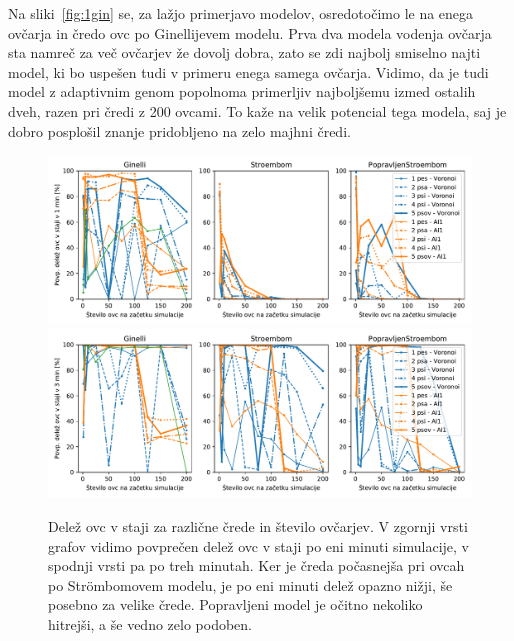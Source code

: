 Na sliki~\ref{fig:1gin} se, za lažjo primerjavo modelov, osredotočimo le na enega ovčarja in čredo ovc po Ginellijevem modelu. Prva dva modela vodenja ovčarja sta namreč za več ovčarjev že dovolj dobra, zato se zdi najbolj smiselno najti model, ki bo uspešen tudi v primeru enega samega ovčarja. Vidimo, da je tudi model z adaptivnim genom popolnoma primerljiv najboljšemu izmed ostalih dveh, razen pri čredi z 200 ovcami. To kaže na velik potencial tega modela, saj je dobro posplošil znanje pridobljeno na zelo majhni čredi.

\begin{figure}[ht]  %
	\centering
	\includegraphics[width=\textwidth]{../poglavja/grafi/povp60s.pdf}
	\includegraphics[width=\textwidth]{../poglavja/grafi/povp180s.pdf}
	\caption[Delež ovc v staji za različne črede in število ovčarjev]{Delež ovc v staji za različne črede in število ovčarjev. V zgornji vrsti grafov vidimo povprečen delež ovc v staji po eni minuti simulacije, v spodnji vrsti pa po treh minutah. Ker je čreda počasnejša pri ovcah po Str{\"o}mbomovem modelu, je po eni minuti delež opazno nižji, še posebno za velike črede. Popravljeni model je očitno nekoliko hitrejši, a še vedno zelo podoben.} %
	\label{fig:180s}
\end{figure}

